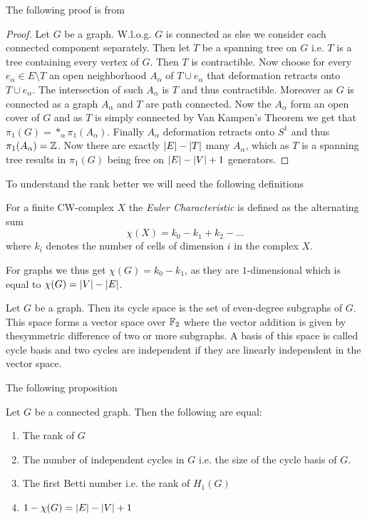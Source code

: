 The following proof is from \cite[p. 43f]{hatcher00}
\begin{proof}
	Let $G$ be a graph. W.l.o.g. $G$ is connected as else we consider each connected component separately. 
	Then let $T$ be a spanning tree on $G$ i.e. $T$ is a tree containing every vertex of $G$.
	Then $T$ is contractible.
	Now choose for every $e_{\alpha} \in E \setminus T$ an open neighborhood $A_{\alpha}$ of $T \cup e_{\alpha}$ that deformation retracts onto $T \cup e_{\alpha}$.
	The intersection of such $A_{\alpha}$ is $T$ and thus contractible. Moreover as $G$ is connected as a graph $A_{\alpha}$ and $T$ are path connected.
	Now the $A_{\alpha}$ form an open cover of $G$ and as $T$ is simply connected by Van Kampen's Theorem we get that $\pi_{1}(G) = *_{\alpha} \pi_{1}(A_{\alpha})$.
	Finally $A_{\alpha}$ deformation retracts onto $S^{1}$ and thus $\pi_{1}(A_{\alpha}) = \mathbb{Z}$. Now there are exactly $\abs{E} - \abs{T}$ many $A_{\alpha}$,
	which as $T$ is a spanning tree results in $\pi_1(G)$ being free on $\abs{E} - \abs{V} + 1$ generators.
\end{proof}

To understand the rank better we will need the following definitions
\begin{definition}
	For a finite CW-complex $X$ the \emph{Euler Characteristic} is defined as the alternating sum
	\[
		\chi(X) = k_0 - k_1 + k_2 - \ldots
	\] 
	where $k_{i}$ denotes the number of cells of dimension $i$ in the complex $X$.
\end{definition}
For graphs we thus get $\chi (G) = k_0 - k_1$, as they are $1$-dimensional which is equal to $\chi(G) = \abs{V} - \abs{E}$.

\begin{definition}
	Let $G$ be a graph. Then its cycle space is the set of even-degree subgraphs of $G$. 
	This space forms a vector space over $\mathbb{F}_2$ where the vector addition is given by thesymmetric difference of two or more subgraphs.
	A basis of this space is called cycle basis and two cycles are independent if they are linearly independent in the vector space.
\end{definition}

The following proposition 
\begin{proposition}\label{prop:rank}
	Let $G$ be a connected graph. Then the following are equal:
	\begin{enumerate}
		\item The rank of $G$
		\item The number of independent cycles in $G$ i.e. the size of the cycle basis of $G$.
		\item The first Betti number i.e. the rank of $H_{1}(G)$
		\item $1 - \chi(G) = \abs{E} - \abs{V} + 1$
	\end{enumerate}
\end{proposition}

